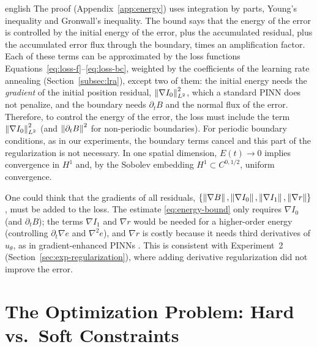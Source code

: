 \documentclass[../0000.tex]{subfiles}
\begin{document}
\begin{hyphenrules}{english}
The proof (Appendix~\ref{app:energy}) uses integration by parts, Young's inequality and Gronwall's inequality.
The bound says that the energy of the error is controlled by the initial energy of the error, plus the
accumulated residual, plus the accumulated error flux through the boundary, times an amplification
factor. Each of these terms can be approximated by the loss functions
Equations~\eqref{eq:loss-f}--\eqref{eq:loss-bc}, weighted by the coefficients of the learning rate annealing
(Section~\ref{subsec:lra}), except two of them: the initial energy needs the \emph{gradient} of the initial
position residual, $\left\lVert \nabla I_0 \right\rVert^2_{L^2}$, which a standard PINN does not penalize, and the boundary
needs $\partial_tB$ and the normal flux of the error. Therefore, to control the energy of the error, the
loss must include the term $\left\lVert \nabla I_0 \right\rVert^2_{L^2}$ (and $\left\lVert \partial_tB \right\rVert^2$ for non-periodic
boundaries). For periodic boundary conditions, as in our experiments, the boundary terms cancel and this
part of the regularization is not necessary. In one spatial dimension, $E(t)\to0$ implies convergence
in $H^1$ and, by the Sobolev embedding $H^1\subset C^{0,1/2}$, uniform convergence.

\begin{remarkbox}
One could think that the gradients of all residuals,
$\{\left\lVert \nabla B \right\rVert,\left\lVert \nabla I_0 \right\rVert,\left\lVert \nabla I_1 \right\rVert,\left\lVert \nabla r \right\rVert\}$, must be added to the loss.
The estimate \eqref{eq:energy-bound} only requires $\nabla I_0$ (and $\partial_tB$); the terms
$\nabla I_1$ and $\nabla r$ would be needed for a higher-order energy (controlling $\partial_t\nabla e$
and $\nabla^2e$), and $\nabla r$ is costly because it needs third derivatives of $u_\theta$, as in
gradient-enhanced PINNs \cite{yu2022gpinn}. This is consistent with Experiment~2
(Section~\ref{sec:exp-regularization}), where adding derivative regularization did not improve the error.
\end{remarkbox}

\section{The Optimization Problem: Hard vs.\ Soft Constraints}\label{sec:optimization}


\end{hyphenrules}
\end{document}
